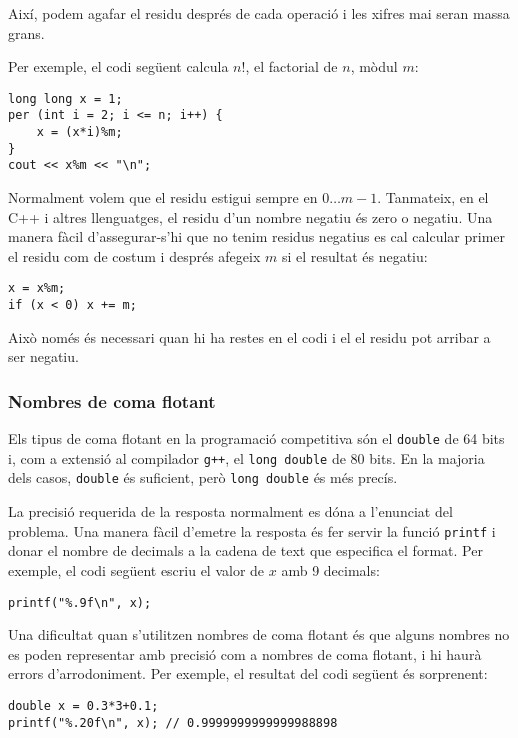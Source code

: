 Així, podem agafar el residu després de cada operació
i les xifres mai seran massa grans.

Per exemple, el codi següent calcula $n!$,
el factorial de $n$, mòdul $m$:
\begin{lstlisting}
long long x = 1;
per (int i = 2; i <= n; i++) {
    x = (x*i)%m;
}
cout << x%m << "\n";
\end{lstlisting}

Normalment volem que el residu estigui sempre
en $0\ldots m-1$.
Tanmateix, en el C++ i altres llenguatges,
el residu d'un nombre negatiu
és zero o negatiu.
Una manera fàcil d'assegurar-s'hi que no tenim
residus negatius es cal calcular primer
el residu com de costum i després afegeix $m$
si el resultat és negatiu:
\begin{lstlisting}
x = x%m;
if (x < 0) x += m;
\end{lstlisting}
Això només és necessari quan hi ha
restes en el codi i el
el residu pot arribar a ser negatiu.

\subsubsection{Nombres de coma flotant}


Els tipus de coma flotant en la
programació competitiva són
el \texttt{double} de 64 bits
i, com a extensió al compilador \texttt{g++},
el \texttt{long double} de 80 bits.
En la majoria dels casos, \texttt{double} és suficient,
però \texttt{long double} és més precís.

La precisió requerida de la resposta
normalment es dóna a l'enunciat del problema.
Una manera fàcil d'emetre la resposta és fer servir
la funció \texttt{printf}
i donar el nombre de decimals
a la cadena de text que especifica el format.
Per exemple, el codi següent escriu
el valor de $x$ amb 9 decimals:

\begin{lstlisting}
printf("%.9f\n", x);
\end{lstlisting}

Una dificultat quan s'utilitzen nombres de coma flotant
és que alguns nombres no es poden representar
amb precisió com a nombres de coma flotant,
i hi haurà errors d'arrodoniment.
Per exemple, el resultat del codi següent
és sorprenent:

\begin{lstlisting}
double x = 0.3*3+0.1;
printf("%.20f\n", x); // 0.9999999999999988898
\end{lstlisting}

